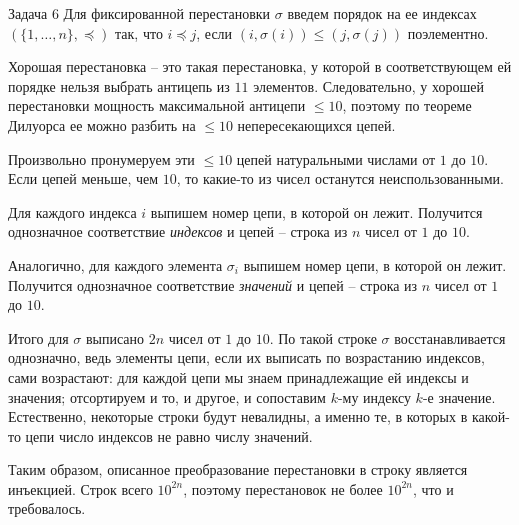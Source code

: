 \documentclass{article}
\begin{document}
	\begin{section}{Задача 6}
		Для фиксированной перестановки $\sigma$ введем порядок на ее индексах $(\{1, \dots, n\}, \preceq)$ так, что $i \preceq j$, если $(i, \sigma(i)) \le (j, \sigma(j))$ поэлементно.

		Хорошая перестановка -- это такая перестановка, у которой в соответствующем ей порядке нельзя выбрать антицепь из $11$ элементов. Следовательно, у хорошей перестановки мощность максимальной антицепи $\le 10$, поэтому по теореме Дилуорса ее можно разбить на $\le 10$ непересекающихся цепей.

		Произвольно пронумеруем эти $\le 10$ цепей натуральными числами от $1$ до $10$. Если цепей меньше, чем $10$, то какие-то из чисел останутся неиспользованными.

		Для каждого индекса $i$ выпишем номер цепи, в которой он лежит. Получится однозначное соответствие \textit{индексов} и цепей -- строка из $n$ чисел от $1$ до $10$.

		Аналогично, для каждого элемента $\sigma_i$ выпишем номер цепи, в которой он лежит. Получится однозначное соответствие \textit{значений} и цепей -- строка из $n$ чисел от $1$ до $10$.

		Итого для $\sigma$ выписано $2n$ чисел от $1$ до $10$. По такой строке $\sigma$ восстанавливается однозначно, ведь элементы цепи, если их выписать по возрастанию индексов, сами возрастают: для каждой цепи мы знаем принадлежащие ей индексы и значения; отсортируем и то, и другое, и сопоставим $k$-му индексу $k$-е значение. Естественно, некоторые строки будут невалидны, а именно те, в которых в какой-то цепи число индексов не равно числу значений.

		Таким образом, описанное преобразование перестановки в строку является инъекцией. Строк всего $10^{2n}$, поэтому перестановок не более $10^{2n}$, что и требовалось.
	\end{section}
\end{document}
